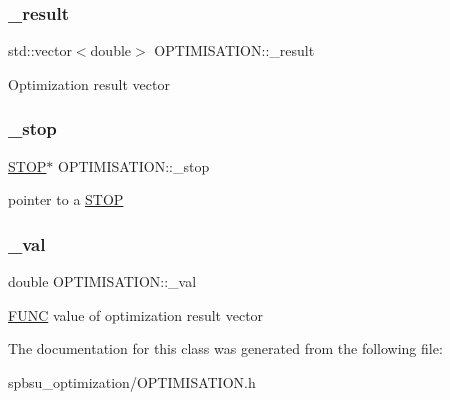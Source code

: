 \subsubsection{\texorpdfstring{\+\_\+result}{\_result}}
{\footnotesize\ttfamily std\+::vector$<$double$>$ O\+P\+T\+I\+M\+I\+S\+A\+T\+I\+O\+N\+::\+\_\+result\hspace{0.3cm}{\ttfamily [protected]}}

Optimization result vector \mbox{\label{class_o_p_t_i_m_i_s_a_t_i_o_n_a756cffba62054d4c9f54b8575e0d771e}} 
\subsubsection{\texorpdfstring{\+\_\+stop}{\_stop}}
{\footnotesize\ttfamily \hyperlink{class_s_t_o_p}{S\+T\+OP}$\ast$ O\+P\+T\+I\+M\+I\+S\+A\+T\+I\+O\+N\+::\+\_\+stop\hspace{0.3cm}{\ttfamily [protected]}}

pointer to a \hyperlink{class_s_t_o_p}{S\+T\+OP} \mbox{\label{class_o_p_t_i_m_i_s_a_t_i_o_n_ab894cbac492adc44c0731f89e99e8a58}} 
\subsubsection{\texorpdfstring{\+\_\+val}{\_val}}
{\footnotesize\ttfamily double O\+P\+T\+I\+M\+I\+S\+A\+T\+I\+O\+N\+::\+\_\+val\hspace{0.3cm}{\ttfamily [protected]}}

\hyperlink{class_f_u_n_c}{F\+U\+NC} value of optimization result vector 

The documentation for this class was generated from the following file\+:\begin{DoxyCompactItemize}
\item 
spbsu\+\_\+optimization/O\+P\+T\+I\+M\+I\+S\+A\+T\+I\+O\+N.\+h\end{DoxyCompactItemize}

